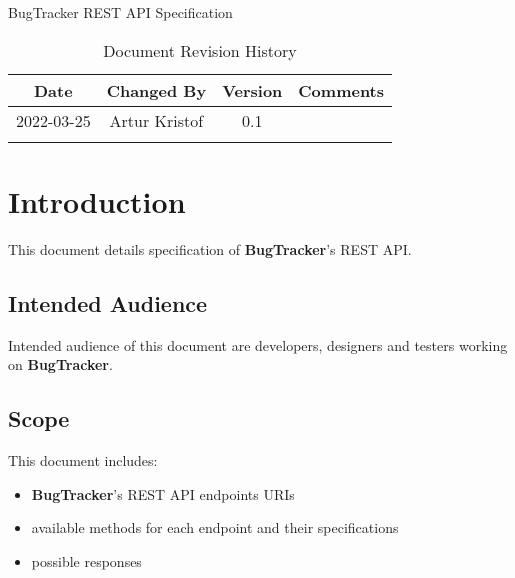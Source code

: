 \documentclass[a4paper]{article}
\newcommand{\appName}{BugTracker}
\newcommand{\appNameBold}{\textbf{BugTracker}}
\begin{document}
    \begin{titlepage}
        \vspace*{\fill}
        \begin{center}
            \huge
            \appName{}
            \vspace{0.4cm}
            \Huge
            REST API Specification
            \vspace{3cm}
            \begin{table}[h]
                \centering
                \caption{Document Revision History}
                \begin{tabular}{cccc}
                    \hline
                    Date       & Changed By    & Version & Comments \\
                    \hline
                    2022-03-25 & Artur Kristof & 0.1     & \hfill   \\
                    \hfill     & \hfill        & \hfill  & \hfill   \\
                    \hline
                \end{tabular}
            \end{table}
        \end{center}
        \vspace*{\fill}
    \end{titlepage}



    \tableofcontents




    \pagebreak
    \section{Introduction}
    This document details specification of \appNameBold{}'s REST API.

    \subsection{Intended Audience}
    Intended audience of this document are developers, designers and testers working on \appNameBold{}.

    \subsection{Scope}
    This document includes:
    \begin{itemize}
        \item \appNameBold{}'s REST API endpoints URIs
        \item available methods for each endpoint and their specifications
        \item possible responses
    \end{itemize}
\end{document}
